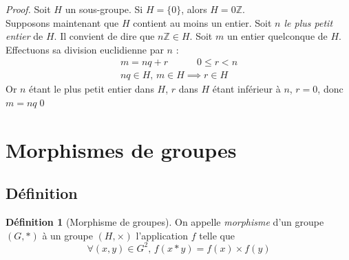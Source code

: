 \documentclass[11pt,a4paper]{report}
\theoremstyle{definition}
\newtheorem{dfn}[theorem]{Définition}
\begin{document}
\begin{proof}
     Soit $H$ un sous-groupe. Si $H=\lbrace 0 \rbrace$, alors $H=0\mathbb{Z}$.\\
     Supposons maintenant que $H$ contient au moins un entier. \newline
     Soit \emph{$n$ le plus petit entier} de $H$. Il convient de dire que $n\mathbb{Z}\in H$. \newline
     Soit $m$ un entier quelconque de $H$. Effectuons sa division euclidienne par $n$ : 
     \begin{gather*}
         m = nq+r \quad\quad\quad 0\le r < n \\
         nq\in H,\, m\in H \implies \boxed{r\in H}
     \end{gather*}
     Or $n$ étant le plus petit entier dans $H$, $r$ dans $H$ étant inférieur à $n$, $r=0$, donc $m=nq$\qed
\end{proof}

\section{Morphismes de groupes} %
\label{sec:morphismes_de_groupes}
\subsection{Définition} %
\label{sub:morphismes_de_groupe_definition}
\begin{dfn}[Morphisme de groupes]
     On appelle \emph{morphisme} d'un groupe $(G,*)$ à un groupe $(H,\times )$ l'application $f$ telle que
     \begin{equation}
     \forall (x,y) \in G^2,\, f \left( x*y \right) = f(x)\times  f(y)
     \end{equation}
\end{dfn}

\end{document}
